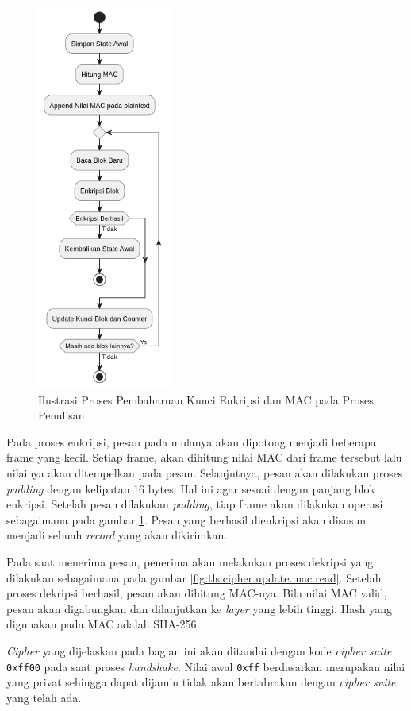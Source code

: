 \begin{figure}[!h]
  \centering
  \includegraphics[width=170px]{chapters/res/chapter-3/img/update.read.png}
  \caption{Ilustrasi Proses Pembaharuan Kunci Enkripsi dan MAC pada Proses Penulisan} \label{fig:tls.cipher.update.mac.write}
\end{figure}

Pada proses enkripsi, pesan pada mulanya akan dipotong menjadi beberapa frame yang kecil. Setiap frame, akan dihitung nilai MAC dari frame tersebut lalu nilainya akan ditempelkan pada pesan. Selanjutnya, pesan akan dilakukan proses \emph{padding} dengan kelipatan 16 bytes. Hal ini agar sesuai dengan panjang blok enkripsi. Setelah pesan dilakukan \emph{padding}, tiap frame akan dilakukan operasi sebagaimana pada gambar \ref{fig:tls.cipher.update.mac.write}. Pesan yang berhasil dienkripsi akan disusun menjadi sebuah \emph{record} yang akan dikirimkan.

Pada saat menerima pesan, penerima akan melakukan proses dekripsi yang dilakukan sebagaimana pada gambar \ref{fig:tls.cipher.update.mac.read}. Setelah proses dekripsi berhasil, pesan akan dihitung MAC-nya. Bila nilai MAC valid, pesan akan digabungkan dan dilanjutkan ke \emph{layer} yang lebih tinggi. Hash yang digunakan pada MAC adalah SHA-256.

\emph{Cipher} yang dijelaskan pada bagian ini akan ditandai dengan kode \emph{cipher suite} \texttt{0xff00} pada saat proses \emph{handshake}. Nilai awal \texttt{0xff} berdasarkan \textcite{rfc5246} merupakan nilai yang privat sehingga dapat dijamin tidak akan bertabrakan dengan \emph{cipher suite} yang telah ada.

